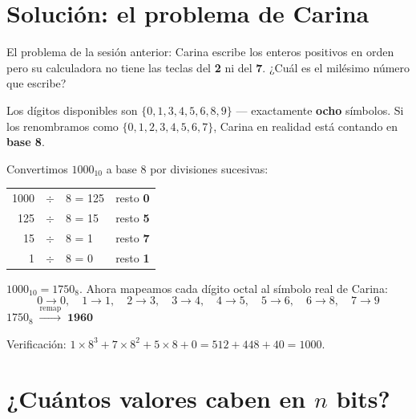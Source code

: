 \documentclass[12pt, oneside]{article}
\begin{document}

\tableofcontents
\newpage

\section{Solución: el problema de Carina}

El problema de la sesión anterior: Carina escribe los enteros positivos
en orden pero su calculadora no tiene las teclas del \textbf{2} ni del
\textbf{7}. ¿Cuál es el milésimo número que escribe?

Los dígitos disponibles son $\{0, 1, 3, 4, 5, 6, 8, 9\}$ — exactamente
\textbf{ocho} símbolos. Si los renombramos como $\{0,1,2,3,4,5,6,7\}$,
Carina en realidad está contando en \textbf{base 8}.

\begin{ejemplo}
Convertimos $1000_{10}$ a base 8 por divisiones sucesivas:
\begin{center}
\begin{tabular}{r@{\;}c@{\;}l@{\quad}l}
  1000 & $\div$ & 8 = 125 & resto \textbf{0} \\
   125 & $\div$ & 8 = 15  & resto \textbf{5} \\
    15 & $\div$ & 8 = 1   & resto \textbf{7} \\
     1 & $\div$ & 8 = 0   & resto \textbf{1} \\
\end{tabular}
\end{center}
$1000_{10} = 1750_8$. Ahora mapeamos cada dígito octal al símbolo real de Carina:
\[
  0\to0,\quad 1\to1,\quad 2\to3,\quad 3\to4,\quad
  4\to5,\quad 5\to6,\quad 6\to8,\quad 7\to9
\]
$1750_8 \;\xrightarrow{\text{remap}}\; \mathbf{1960}$
\end{ejemplo}

\begin{recuerda}
  Verificación: $1\times8^3 + 7\times8^2 + 5\times8 + 0 = 512+448+40 = 1000$. \checkmark
\end{recuerda}

\section{¿Cuántos valores caben en $n$ bits?}
\end{document}
